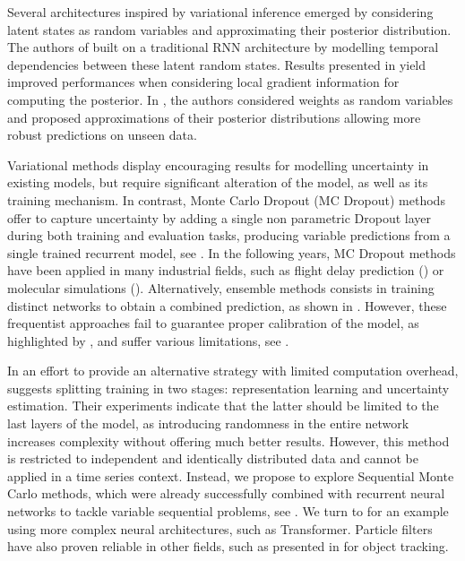 \documentclass{article}
\begin{document}
Several architectures inspired by variational inference emerged by considering latent states as random variables and approximating their posterior distribution.
The authors of \cite{Chung2015NIPS} built on a traditional RNN architecture by modelling temporal dependencies between these latent random states.
Results presented in \cite{Fortunato2017bayesian} yield improved performances when considering local gradient information for computing the posterior.
In \cite{Blundell2015}, the authors considered weights as random variables and proposed approximations of their posterior distributions allowing more robust predictions on unseen data.

Variational methods display encouraging results for modelling uncertainty in existing models, but require significant alteration of the model, as well as its training mechanism.
In contrast, Monte Carlo Dropout (MC Dropout) methods offer to capture uncertainty by adding a single non parametric Dropout layer during both training and evaluation tasks, producing variable predictions from a single trained recurrent model, see \cite{Gal2016NIPS}.
In the following years, MC Dropout methods have been applied in many industrial fields, such as flight delay prediction (\cite{Vandal2018}) or molecular simulations (\cite{Wen2020UncertaintyQI}).
Alternatively, ensemble methods consists in training distinct networks to obtain a combined prediction, as shown in \cite{Pearce2018}.
However, these frequentist approaches fail to guarantee proper calibration of the model, as highlighted by \cite{ashukha2020pitfalls}, and suffer various limitations, see \cite{Fong2020}.

In an effort to provide an alternative strategy with limited computation overhead, \cite{Brosse2020OnLA} suggests splitting training in two stages: representation learning and uncertainty estimation.
Their experiments indicate that the latter should be limited to the last layers of the model, as introducing randomness in the entire network increases complexity without offering much better results. However, this method is restricted to independent and identically distributed data and cannot be applied in a time series context.
Instead, we propose to explore Sequential Monte Carlo methods, which were already successfully combined with recurrent neural networks to tackle variable sequential problems, see \cite{Ma2020}.
We turn to \cite{Martin2020TheMC} for an example using more complex neural architectures, such as Transformer.
Particle filters have also proven reliable in other fields, such as presented in \cite{Liu2020LSTMPF} for object tracking.
\end{document}
